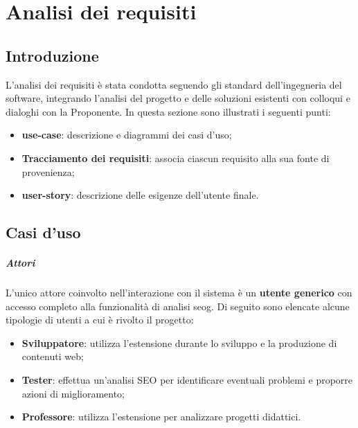 \chapter{Analisi dei requisiti}
\label{cap:analisi-requisiti}


\section{Introduzione}

\par L'analisi dei \gls{requisiti} è stata condotta seguendo gli standard dell'ingegneria del software, integrando l'analisi del progetto e delle soluzioni esistenti con colloqui e dialoghi con la Proponente. In questa sezione sono illustrati i seguenti punti:
\begin{itemize}
    \item \textbf{\gls{use-case}}: descrizione e diagrammi dei casi d'uso;
    \item \textbf{Tracciamento dei requisiti}: associa ciascun requisito alla sua fonte di provenienza;
    \item \textbf{\gls{user-story}}: descrizione delle esigenze dell’utente finale.
\end{itemize}

\section{Casi d'uso}

\paragraph*{Attori}
\par L'unico attore coinvolto nell'interazione con il sistema è un \textbf{utente generico} con accesso completo alla funzionalità di analisi \gls{seog}. Di seguito sono elencate alcune tipologie di utenti a cui è rivolto il progetto:
\begin{itemize}
    \item \textbf{Sviluppatore}: utilizza l'estensione durante lo sviluppo e la produzione di contenuti web;
    \item \textbf{Tester}: effettua un'analisi SEO per identificare eventuali problemi e proporre azioni di miglioramento;
    \item \textbf{Professore}: utilizza l'estensione per analizzare progetti didattici.
\end{itemize}

